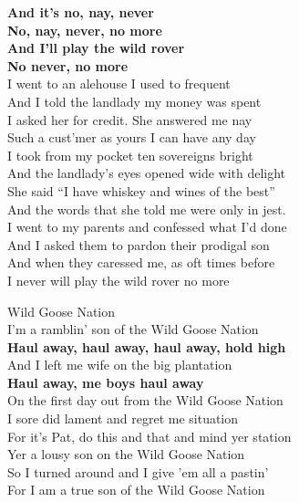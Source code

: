 \documentclass[letterpaper,9pt]{article}
\begin{document}
\textbf{And it’s no, nay, never \\
No, nay, never, no more \\
And I’ll play the wild rover \\
No never, no more} \\

I went to an alehouse I used to frequent \\
And I told the landlady my money was spent \\
I asked her for credit. She answered me nay \\
Such a cust’mer as yours I can have any day \\

I took from my pocket ten sovereigns bright \\
And the landlady’s eyes opened wide with delight \\
She said “I have whiskey and wines of the best” \\
And the words that she told me were only in jest. \\

I went to my parents and confessed what I’d done \\
And I asked them to pardon their prodigal son \\
And when they caressed me, as oft times before \\
I never will play the wild rover no more \\

\newpage
{}
\Huge
Wild Goose Nation\\

\huge
I'm a ramblin' son of the Wild Goose Nation \\
\textbf{Haul away, haul away, haul away, hold high} \\
And I left me wife on the big plantation \\
\textbf{Haul away, me boys haul away} \\

On the first day out from the Wild Goose Nation \\
I sore did lament and regret me situation \\

For it's Pat, do this and that and mind yer station \\
Yer a lousy son on the Wild Goose Nation \\

So I turned around and I give 'em all a pastin' \\
For I am a true son of the Wild Goose Nation \\
\end{document}
